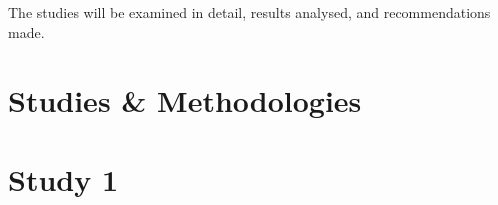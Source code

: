 The studies will be examined in detail, results analysed, and recommendations made.  





\section{Studies \& Methodologies\label{Hardware:Studies and Methodologies}}








\section{Study 1\label{Hardware:Study 1}}
